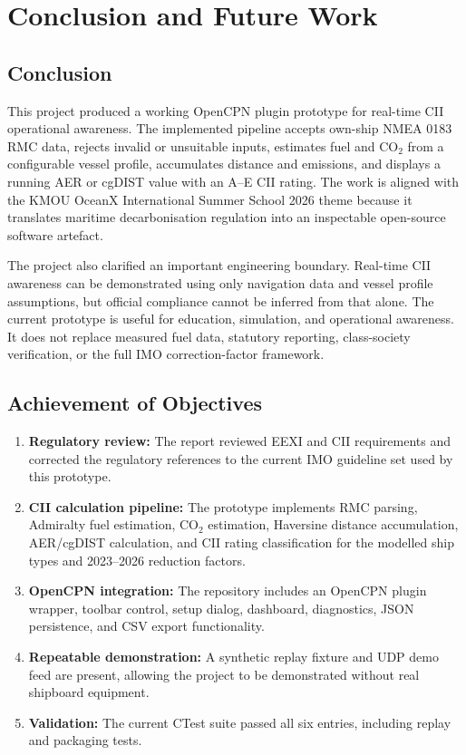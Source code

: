 \chapter{Conclusion and Future Work}
\label{chap:conclusion}

\section{Conclusion}
This project produced a working OpenCPN plugin prototype for real-time CII operational awareness. The implemented pipeline accepts own-ship NMEA 0183 RMC data, rejects invalid or unsuitable inputs, estimates fuel and CO$_2$ from a configurable vessel profile, accumulates distance and emissions, and displays a running AER or cgDIST value with an A--E CII rating. The work is aligned with the KMOU OceanX International Summer School 2026 theme because it translates maritime decarbonisation regulation into an inspectable open-source software artefact.

The project also clarified an important engineering boundary. Real-time CII awareness can be demonstrated using only navigation data and vessel profile assumptions, but official compliance cannot be inferred from that alone. The current prototype is useful for education, simulation, and operational awareness. It does not replace measured fuel data, statutory reporting, class-society verification, or the full IMO correction-factor framework.

\section{Achievement of Objectives}
\begin{enumerate}
    \item \textbf{Regulatory review:} The report reviewed EEXI and CII requirements and corrected the regulatory references to the current IMO guideline set used by this prototype.
    \item \textbf{CII calculation pipeline:} The prototype implements RMC parsing, Admiralty fuel estimation, CO$_2$ estimation, Haversine distance accumulation, AER/cgDIST calculation, and CII rating classification for the modelled ship types and 2023--2026 reduction factors.
    \item \textbf{OpenCPN integration:} The repository includes an OpenCPN plugin wrapper, toolbar control, setup dialog, dashboard, diagnostics, JSON persistence, and CSV export functionality.
    \item \textbf{Repeatable demonstration:} A synthetic replay fixture and UDP demo feed are present, allowing the project to be demonstrated without real shipboard equipment.
    \item \textbf{Validation:} The current CTest suite passed all six entries, including replay and packaging tests.
\end{enumerate}

